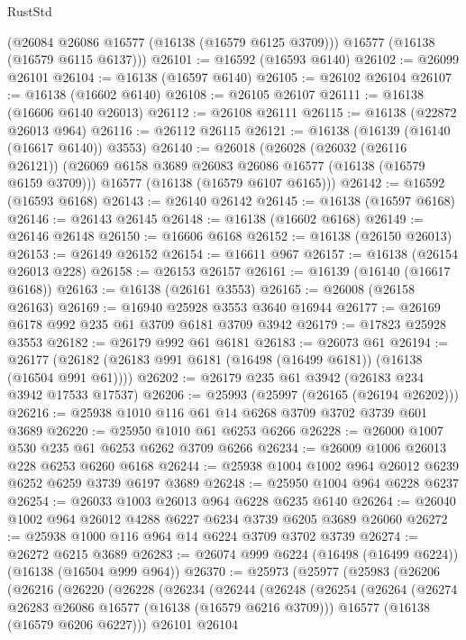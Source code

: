 \begin{lexlean}{RustStd}
\begin{coremodule}
      (@26084 @26086 @16577 (@16138 (@16579 @6125 @3709)))
      @16577
      (@16138 (@16579 @6115 @6137)))
@26101 := @16592 (@16593 @6140)
@26102 := @26099 @26101
@26104 := @16138 (@16597 @6140)
@26105 := @26102 @26104
@26107 := @16138 (@16602 @6140)
@26108 := @26105 @26107
@26111 := @16138 (@16606 @6140 @26013)
@26112 := @26108 @26111
@26115 := @16138 (@22872 @26013 @964)
@26116 := @26112 @26115
@26121 := @16138 (@16139 (@16140 (@16617 @6140)) @3553)
@26140 := @26018
    (@26028
      (@26032 (@26116 @26121))
      (@26069 @6158 @3689 @26083 @26086 @16577 (@16138 (@16579 @6159 @3709)))
      @16577
      (@16138 (@16579 @6107 @6165)))
@26142 := @16592 (@16593 @6168)
@26143 := @26140 @26142
@26145 := @16138 (@16597 @6168)
@26146 := @26143 @26145
@26148 := @16138 (@16602 @6168)
@26149 := @26146 @26148
@26150 := @16606 @6168
@26152 := @16138 (@26150 @26013)
@26153 := @26149 @26152
@26154 := @16611 @967
@26157 := @16138 (@26154 @26013 @228)
@26158 := @26153 @26157
@26161 := @16139 (@16140 (@16617 @6168))
@26163 := @16138 (@26161 @3553)
@26165 := @26008 (@26158 @26163)
@26169 := @16940 @25928 @3553 @3640 @16944
@26177 := @26169 @6178 @992 @235 @61 @3709 @6181 @3709 @3942
@26179 := @17823 @25928 @3553
@26182 := @26179 @992 @61 @6181
@26183 := @26073 @61
@26194 := @26177 (@26182 (@26183 @991 @6181 (@16498 (@16499 @6181)) (@16138 (@16504 @991 @61))))
@26202 := @26179 @235 @61 @3942 (@26183 @234 @3942 @17533 @17537)
@26206 := @25993 (@25997 (@26165 (@26194 @26202)))
@26216 := @25938 @1010 @116 @61 @14 @6268 @3709 @3702 @3739 @601 @3689
@26220 := @25950 @1010 @61 @6253 @6266
@26228 := @26000 @1007 @530 @235 @61 @6253 @6262 @3709 @6266
@26234 := @26009 @1006 @26013 @228 @6253 @6260 @6168
@26244 := @25938 @1004 @1002 @964 @26012 @6239 @6252 @6259 @3739 @6197 @3689
@26248 := @25950 @1004 @964 @6228 @6237
@26254 := @26033 @1003 @26013 @964 @6228 @6235 @6140
@26264 := @26040 @1002 @964 @26012 @4288 @6227 @6234 @3739 @6205 @3689 @26060
@26272 := @25938 @1000 @116 @964 @14 @6224 @3709 @3702 @3739
@26274 := @26272 @6215 @3689
@26283 := @26074 @999 @6224 (@16498 (@16499 @6224)) (@16138 (@16504 @999 @964))
@26370 := @25973
    (@25977
      (@25983
        (@26206
          (@26216
            (@26220
              (@26228
                (@26234
                  (@26244
                    (@26248
                      (@26254
                        (@26264
                          (@26274 @26283 @26086 @16577 (@16138 (@16579 @6216 @3709)))
                          @16577
                          (@16138 (@16579 @6206 @6227)))
                        @26101
                        @26104

\end{coremodule}
\end{lexlean}
